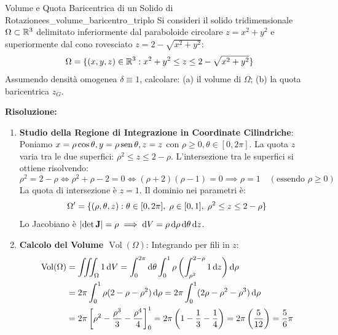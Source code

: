 \begin{esempio}{Volume e Quota Baricentrica di un Solido di Rotazione}{es_volume_baricentro_triplo}
Si consideri il solido tridimensionale $\Omega \subset \mathbb{R}^3$ delimitato inferiormente dal paraboloide circolare $z = x^2 + y^2$ e superiormente dal cono rovesciato $z = 2 - \sqrt{x^2 + y^2}$:
\[
\Omega = \{(x,y,z) \in \mathbb{R}^3 : x^2 + y^2 \le z \le 2 - \sqrt{x^2 + y^2}\}
\]
Assumendo densità omogenea $\delta \equiv 1$, calcolare: (a) il volume di $\Omega$; (b) la quota baricentrica $z_G$.

\medskip\noindent\textbf{Risoluzione:}
\begin{enumerate}
    \item \textbf{Studio della Regione di Integrazione in Coordinate Cilindriche}:
    Poniamo $x = \rho \cos\theta, y = \rho \operatorname{sen}\theta, z = z$ con $\rho \ge 0, \theta \in [0, 2\pi]$.
    La quota $z$ varia tra le due superfici: $\rho^2 \le z \le 2 - \rho$.
    L'intersezione tra le superfici si ottiene risolvendo:
    \[
    \rho^2 = 2 - \rho \iff \rho^2 + \rho - 2 = 0 \iff (\rho + 2)(\rho - 1) = 0 \implies \rho = 1 \quad (\text{essendo } \rho \ge 0)
    \]
    La quota di intersezione è $z = 1$. Il dominio nei parametri è:
    \[
    \Omega' = \{(\rho, \theta, z) : \theta \in [0, 2\pi], \; \rho \in [0, 1], \; \rho^2 \le z \le 2 - \rho\}
    \]
    Lo Jacobiano è $\lvert\det \mathbf{J}\rvert = \rho \implies \mathop{}\!\mathrm{d} V = \rho \mathop{}\!\mathrm{d} \rho \mathop{}\!\mathrm{d} \theta \mathop{}\!\mathrm{d} z$.

    \item \textbf{Calcolo del Volume $\operatorname{Vol}(\Omega)$}:
    Integrando per fili in $z$:
    \begin{align*}
    \operatorname{Vol}(\Omega) &= \iiint_\Omega 1 \mathop{}\!\mathrm{d} V = \int_{0}^{2\pi} \mathop{}\!\mathrm{d} \theta \int_{0}^{1} \rho \left( \int_{\rho^2}^{2-\rho} 1 \mathop{}\!\mathrm{d} z \right) \mathop{}\!\mathrm{d} \rho \\
    &= 2\pi \int_{0}^{1} \rho (2 - \rho - \rho^2) \mathop{}\!\mathrm{d} \rho = 2\pi \int_{0}^{1} (2\rho - \rho^2 - \rho^3) \mathop{}\!\mathrm{d} \rho \\
    &= 2\pi \left[ \rho^2 - \frac{\rho^3}{3} - \frac{\rho^4}{4} \right]_0^1 = 2\pi \left( 1 - \frac{1}{3} - \frac{1}{4} \right) = 2\pi \left( \frac{5}{12} \right) = \frac{5}{6}\pi
    \end{align*}


\end{enumerate}
\end{esempio}
